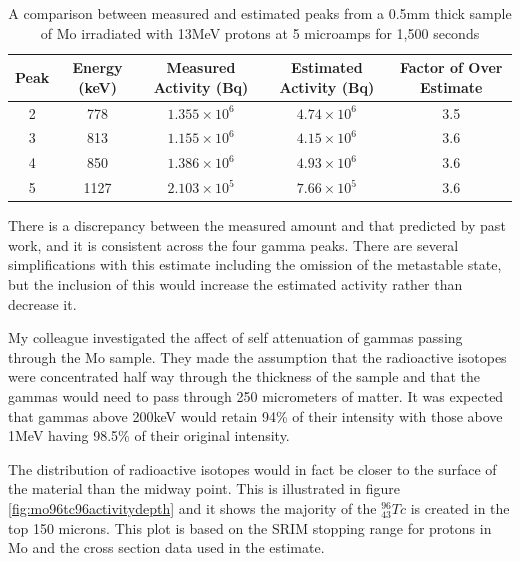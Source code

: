 \begin{table}[h]
\begin{center}
\begin{tabular}{c c c c c}
\hline\hline
Peak & Energy (keV) & Measured Activity (Bq) & Estimated Activity (Bq) & Factor of Over Estimate\\
\hline\hline
2 & 778 & $1.355 \times 10^{6}$ & $4.74 \times 10^{6}$ & 3.5\\
3 & 813 & $1.155 \times 10^{6}$ & $4.15 \times 10^{6}$ & 3.6\\
4 & 850 & $1.386 \times 10^{6}$ & $4.93 \times 10^{6}$ & 3.6 \\
5 & 1127 & $2.103 \times 10^{5}$ & $7.66 \times 10^{5}$ & 3.6 \\
\hline\hline
\end{tabular}
\end{center}
\caption{A comparison between measured and estimated peaks from a 0.5mm thick sample of \Gls{Mo} irradiated with 13MeV protons at 5 microamps for 1,500 seconds}
\label{table:johnhewettresultsvestimate}
\end{table}

There is a discrepancy between the measured amount and that predicted by past work, and it is consistent across the four gamma peaks.  There are several simplifications with this estimate including the omission of the metastable state, but the inclusion of this would increase the estimated activity rather than decrease it.

My colleague investigated the affect of self attenuation of gammas passing through the \Gls{Mo} sample.  They made the assumption that the radioactive isotopes were concentrated half way through the thickness of the sample and that the gammas would need to pass through 250 micrometers of matter.  It was expected that gammas above 200keV would retain 94\% of their intensity with those above 1MeV having 98.5\% of their original intensity\cite{johnhewett}.

The distribution of radioactive isotopes would in fact be closer to the surface of the material than the midway point.  This is illustrated in figure \ref{fig:mo96tc96activitydepth} and it shows the majority of the ${}^{96}_{43}Tc$ is created in the top 150 microns.  This plot is based on the SRIM stopping range for protons in \Gls{Mo} and the cross section data used in the estimate.

